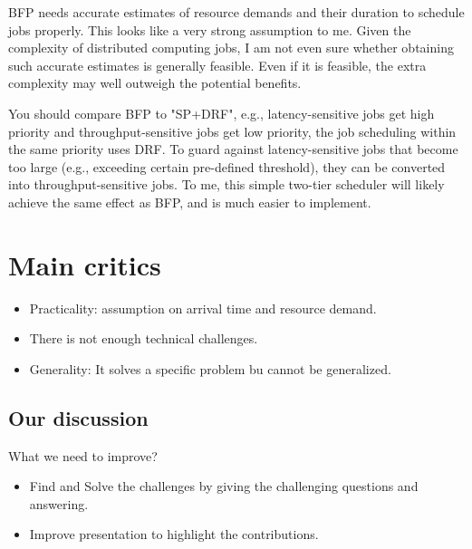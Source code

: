  BFP needs accurate estimates of resource demands and their duration to schedule jobs properly. This looks like a very strong assumption to me. Given the complexity of distributed computing jobs, I am not even sure whether obtaining such accurate estimates is generally feasible. Even if it is feasible, the extra complexity may well outweigh the potential benefits.
 
 You should compare BFP to  "SP+DRF", e.g., latency-sensitive jobs get high priority and throughput-sensitive jobs get low priority, the job scheduling within the same priority uses DRF. To guard against latency-sensitive jobs that become too large (e.g., exceeding certain pre-defined threshold), they can be converted into throughput-sensitive jobs. To me, this simple two-tier scheduler will likely achieve the same effect as BFP, and is much easier to implement.
 
\section{Main critics}

\begin{itemize}
	\item Practicality: assumption on arrival time and resource demand.
	\item There is not enough technical challenges.
	\item Generality: It solves a specific problem bu cannot be generalized.
\end{itemize}  
  
 
 \subsection{Our discussion}
 
 What we need to improve?
 
 \begin{itemize}
 	\item Find and Solve the challenges by giving the challenging questions and answering.
 	\item Improve presentation to highlight the contributions.
 \end{itemize}